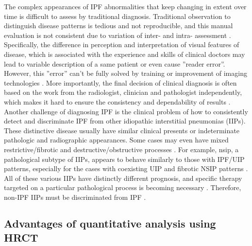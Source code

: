 The complex appearances of IPF abnormalities that keep changing in extent over time is difficult to assess by traditional diagnosis. Traditional observation to distinguish disease patterns is tedious and not reproducible, and this manual evaluation is not consistent due to variation of inter- and intra- assessment \citep{flaherty2007idiopathic, watadani2013interobserver}. Specifically, the difference in perception and interpretation of visual features of disease, which is associated with the experience and skills of clinical doctors may lead to variable description of a same patient or even cause ''reader error''. However, this ''error'' can't be fully solved by training or improvement of imaging technologies \citep{kundel2006history,bartholmai2013quantitative}. More importantly, the final decision of clinical diagnosis is often based on the work from the radiologist, clinician and pathologist independently, which makes it hard to ensure the consistency and dependability of results  \citep{flaherty2004idiopathic,sverzellati2011method}. Another challenge of diagnosing IPF is the clinical problem of how to consistently detect and discriminate IPF from other idiopathic interstitial pneumonias (IIPs). These distinctive disease usually have similar clinical presents or indeterminate pathologic and radiographic appearances. Some cases may even have mixed restrictive/fibrotic and destructive/obstructive processes \citep{bartholmai2013quantitative}. For example, \gls{nsip}, a pathological subtype of IIPs, appears to behave similarly to those with IPF/UIP patterns, especially for the cases with coexisting UIP and fibrotic NSIP patterns \citep{monaghan2004prognostic, flaherty2001histopathologic}. All of these various IIPs have distinctly different prognosis, and specific therapy targeted on a particular pathological process is becoming necessary \citep{lynch2005high}. Therefore, non-IPF IIPs must be discriminated from IPF \citep{bjoraker1998prognostic}. 

\subsection{Advantages of quantitative analysis using HRCT} \label{Advantages}

